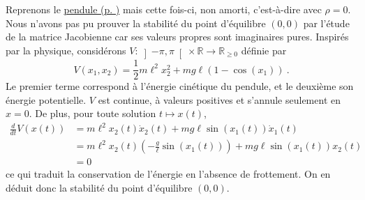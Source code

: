 \hypertarget{ex_pendule_lyap}{}
\begin{exemple}\label{ex_pendule_lyap}
Reprenons le \protect\hyperlink{ex_pendule}{pendule (p.
\pageref*{ex_pendule})} mais cette fois-ci, non amorti, c'est-à-dire
avec \(\rho=0\). Nous n'avons pas pu prouver la stabilité du point
d'équilibre \((0,0)\) par l'étude de la matrice Jacobienne car ses
valeurs propres sont imaginaires pures. Inspirés par la physique,
considérons
\(V:\left] -\pi, \pi\right[\times \mathbb{R}\to \mathbb{R}_{\geq 0}\)
définie par \[
V(x_1,x_2) = \frac{1}{2} m\ell^2 x_2^2 + mg\ell(1-\cos(x_1)) \ .
\] Le premier terme correspond à l'énergie cinétique du pendule, et le
deuxième son énergie potentielle. \(V\) est continue, à valeurs
positives et s'annule seulement en \(x=0\). De plus, pour toute solution
\(t\mapsto x(t)\), \begin{align*}
\frac{d}{dt} V(x(t)) &=  m\ell^2 x_2(t) \dot x_2(t) + mg \ell \sin(x_1(t)) \dot x_1(t) \\
&= m\ell^2 x_2(t)\left(-\frac{g}{\ell} \sin(x_1(t))\right) + mg \ell \sin(x_1(t)) x_2(t) \\
&= 0 
\end{align*} ce qui traduit la conservation de l'énergie en l'absence de
frottement. On en déduit donc la stabilité du point d'équilibre
\((0,0)\).
\end{exemple}

